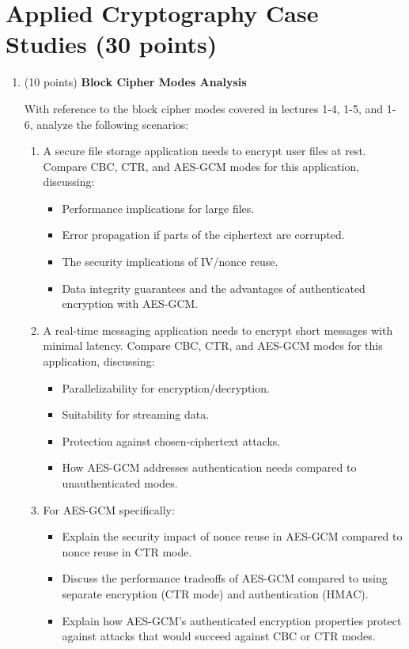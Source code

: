 \documentclass[10pt,a4paper,american]{article}
\begin{document}
\section{Applied Cryptography Case Studies (30 points)}

\begin{enumerate}
	\item (10 points) \textbf{Block Cipher Modes Analysis}

	      With reference to the block cipher modes covered in lectures 1-4, 1-5, and 1-6, analyze the following scenarios:
	      \begin{enumerate}
		      \item A secure file storage application needs to encrypt user files at rest. Compare CBC, CTR, and AES-GCM modes for this application, discussing:
		            \begin{itemize}
			            \item Performance implications for large files.
			            \item Error propagation if parts of the ciphertext are corrupted.
			            \item The security implications of IV/nonce reuse.
			            \item Data integrity guarantees and the advantages of authenticated encryption with AES-GCM.
		            \end{itemize}
		      \item A real-time messaging application needs to encrypt short messages with minimal latency. Compare CBC, CTR, and AES-GCM modes for this application, discussing:
		            \begin{itemize}
			            \item Parallelizability for encryption/decryption.
			            \item Suitability for streaming data.
			            \item Protection against chosen-ciphertext attacks.
			            \item How AES-GCM addresses authentication needs compared to unauthenticated modes.
		            \end{itemize}
		      \item For AES-GCM specifically:
		            \begin{itemize}
			            \item Explain the security impact of nonce reuse in AES-GCM compared to nonce reuse in CTR mode.
			            \item Discuss the performance tradeoffs of AES-GCM compared to using separate encryption (CTR mode) and authentication (HMAC).
			            \item Explain how AES-GCM's authenticated encryption properties protect against attacks that would succeed against CBC or CTR modes.
		            \end{itemize}
	      \end{enumerate}


\end{enumerate}
\end{document}
